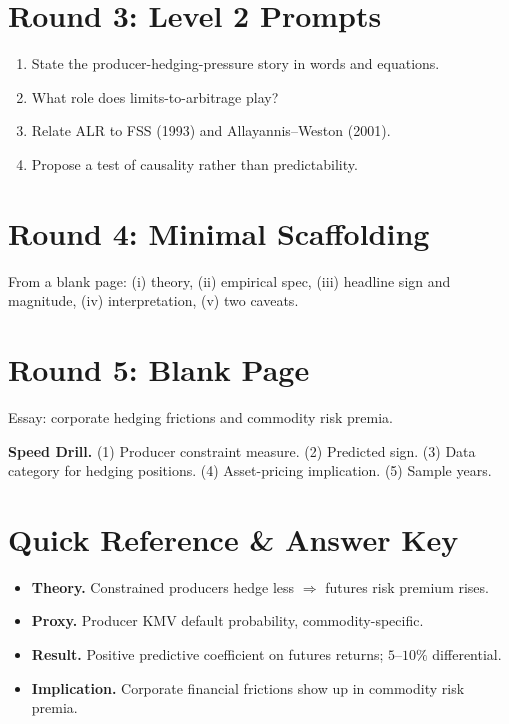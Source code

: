 \documentclass[11pt]{article}
\begin{document}
\section*{Round 3: Level 2 Prompts}
\begin{enumerate}
\item State the producer-hedging-pressure story in words and equations.
\item What role does limits-to-arbitrage play?
\item Relate ALR to FSS (1993) and Allayannis--Weston (2001).
\item Propose a test of causality rather than predictability.
\end{enumerate}

\section*{Round 4: Minimal Scaffolding}
From a blank page: (i) theory, (ii) empirical spec, (iii) headline sign and magnitude, (iv) interpretation, (v) two caveats.

\section*{Round 5: Blank Page}
Essay: corporate hedging frictions and commodity risk premia.

\vspace{6pt}
\begin{drillbox}
\textbf{Speed Drill.} (1) Producer constraint measure. (2) Predicted sign. (3) Data category for hedging positions. (4) Asset-pricing implication. (5) Sample years.
\end{drillbox}

\section*{Quick Reference \& Answer Key}
\begin{answerbox}
\begin{itemize}
\item \textbf{Theory.} Constrained producers hedge less $\Rightarrow$ futures risk premium rises.
\item \textbf{Proxy.} Producer KMV default probability, commodity-specific.
\item \textbf{Result.} Positive predictive coefficient on futures returns; $5$--$10\%$ differential.
\item \textbf{Implication.} Corporate financial frictions show up in commodity risk premia.
\end{itemize}
\end{answerbox}
\end{document}
